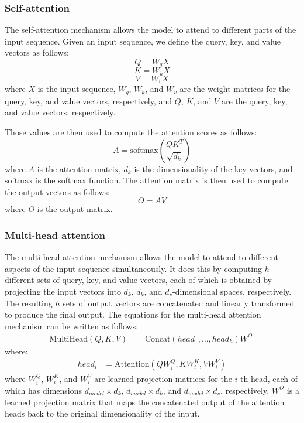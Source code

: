 \documentclass[a4paper, noexaminfo]{sapthesis}
\begin{document}
\subsubsection{Self-attention}
The self-attention mechanism allows the model to 
attend to different parts of the input sequence. Given an input sequence,
we define the query, key, and value vectors as follows:
\begin{equation}
  Q = W_{q}X
  \end{equation}
\begin{equation}
  K = W_{k}X
  \end{equation}
\begin{equation}
  V = W_{v}X
  \end{equation}
where $X$ is the input sequence, $W_q$, $W_k$, and $W_v$ are the weight
  matrices for the query, key, and value vectors, respectively, and $Q$,
  $K$, and $V$ are the query, key, and value vectors, respectively. 
  
  Those values are then used to compute the attention scores as follows:
  \begin{equation}
    A = \text{softmax}\left(\frac{QK^T}{\sqrt{d_k}}\right)
    \end{equation}
where $A$ is the attention matrix, $d_k$ is the dimensionality of the
  key vectors, and $\text{softmax}$ is the softmax function. The 
  attention matrix is then used to compute the output vectors as follows:
  \begin{equation}
    O = AV
    \end{equation}
where $O$ is the output matrix. 
\subsubsection{Multi-head attention}
The multi-head attention mechanism allows the model to attend to different
 aspects of the input sequence simultaneously. It does this by 
computing $h$ different sets of query, key, and value vectors,
each of which is obtained by projecting the input vectors into
$d_k$, $d_k$, and $d_v$-dimensional spaces, respectively. 
The resulting $h$ sets of output vectors are concatenated
 and linearly transformed to produce the final output.\newline
 The equations for the multi-head attention mechanism can be written as 
 follows:
 \begin{align*}
 \text{MultiHead}(Q,K,V) &= \text{Concat}(head_1,\ldots,head_h)W^O \
\end{align*}
where:
 \begin{align*}
   head_i &= \text{Attention}(QW_i^Q, KW_i^K, VW_i^V)
 \end{align*}
 where $W_i^Q$, $W_i^K$, and $W_i^V$ are learned projection matrices for
  the $i$-th head, each of which has dimensions $d_{model}\times d_k$,
   $d_{model}\times d_k$, and $d_{model}\times d_v$, respectively.
    $W^O$ is a learned projection matrix that maps the concatenated
 output of the attention heads back to the original dimensionality of
  the input.
\end{document}

